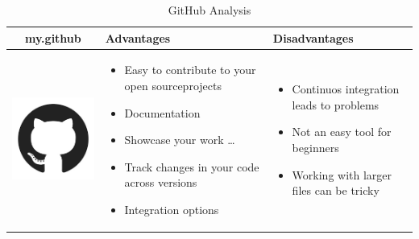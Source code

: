 \documentclass{article}
\begin{document}
	\begin{table}[h!]
		\centering
		\begin{tabular}{|c| m{5cm} | m{5cm} |}
			\hline
			my.github & Advantages & Disadvantages \\ \hline
			\begin{minipage}{.4\textwidth}
				\includegraphics[width=\linewidth,height=40mm]{github}
			\end{minipage}
		&
		\begin{itemize}
			\item Easy to contribute to your open sourceprojects
			\item Documentation 
			\item Showcase your work \ldots
			\item Track changes in your code across versions
			\item Integration options
		\end{itemize}
	&
	\begin{itemize}
		\item Continuos integration leads to problems
		\item Not an easy tool for beginners
		\item Working with larger files can be tricky
	\end{itemize}
	\\ \hline
		\end{tabular}
	\caption{GitHub Analysis}\label{tbl:mygitHub}
	\end{table}
\end{document}
